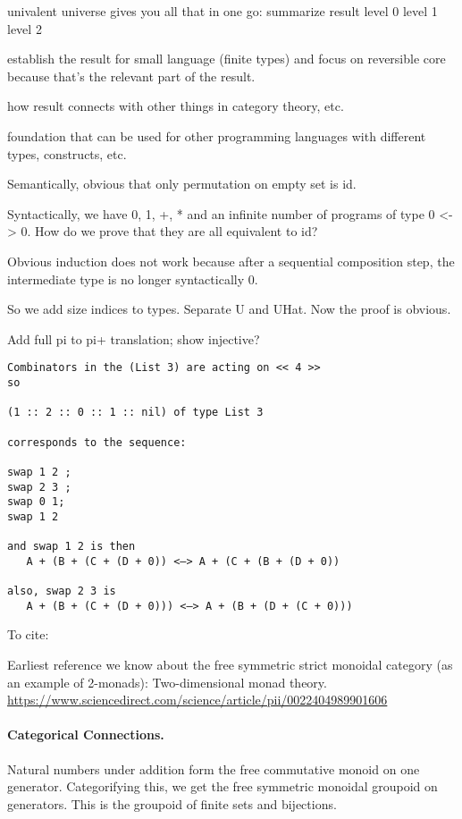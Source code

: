 
univalent universe gives you all that in one go: summarize result
level 0
level 1
level 2

establish the result for small language (finite types) and focus on reversible
core because that's the relevant part of the result.

how result connects with other things in category theory, etc.

foundation that can be used for other programming languages with different
types, constructs, etc.


Semantically, obvious that only permutation on empty set is id.

Syntactically, we have 0, 1, +, *  and an infinite number of programs of type 0
<-> 0. How do we prove that they are all equivalent to id?

Obvious induction does not work because after a sequential composition step, the
intermediate type is no longer syntactically 0.

So we add size indices to types. Separate U and UHat. Now the proof is obvious.


Add full pi to pi+ translation; show injective?

\begin{verbatim}
Combinators in the (List 3) are acting on << 4 >>
so

(1 :: 2 :: 0 :: 1 :: nil) of type List 3

corresponds to the sequence:

swap 1 2 ;
swap 2 3 ;
swap 0 1;
swap 1 2

and swap 1 2 is then
   A + (B + (C + (D + 0)) <—> A + (C + (B + (D + 0))

also, swap 2 3 is
   A + (B + (C + (D + 0))) <—> A + (B + (D + (C + 0)))
\end{verbatim}

To cite:

Earliest reference we know about the free symmetric strict monoidal category (as
an example of 2-monads): Two-dimensional monad
theory. \url{https://www.sciencedirect.com/science/article/pii/0022404989901606}


\paragraph*{Categorical Connections.}

Natural numbers under addition form the free commutative monoid on one generator. Categorifying this, we get the free
symmetric monoidal groupoid on generators. This is the groupoid of finite sets and bijections.

